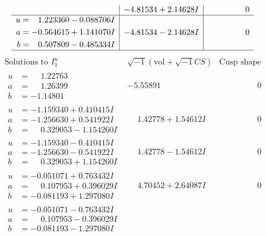 \documentclass[1p]{elsarticle_modified}
\theoremstyle{definition}
\newcommand{\I}{\sqrt{-1}}
\begin{document}
$$\begin{array}{c|c|c}
 & -4.81534 + 2.14628 I & \phantom{-0.000000 } 0 \\ \hline\begin{aligned}
u &= \phantom{-}1.223360 - 0.088706 I \\
a &= -0.564615 + 1.141070 I \\
b &= \phantom{-}0.507809 - 0.485334 I\end{aligned}
 & -4.81534 - 2.14628 I & \phantom{-0.000000 } 0\\
 \hline 
 \end{array}$$\newpage$$\begin{array}{c|c|c}  
\text{Solutions to }I^u_{1}& \I (\text{vol} + \sqrt{-1}CS) & \text{Cusp shape}\\
 \hline 
\begin{aligned}
u &= \phantom{-}1.22763\phantom{ +0.000000I} \\
a &= \phantom{-}1.26399\phantom{ +0.000000I} \\
b &= -1.14801\phantom{ +0.000000I}\end{aligned}
 & -5.55891\phantom{ +0.000000I} & \phantom{-0.000000 } 0 \\ \hline\begin{aligned}
u &= -1.159340 + 0.410415 I \\
a &= -1.256630 + 0.541922 I \\
b &= \phantom{-}0.329053 - 1.154260 I\end{aligned}
 & \phantom{-}1.42778 + 1.54612 I & \phantom{-0.000000 } 0 \\ \hline\begin{aligned}
u &= -1.159340 - 0.410415 I \\
a &= -1.256630 - 0.541922 I \\
b &= \phantom{-}0.329053 + 1.154260 I\end{aligned}
 & \phantom{-}1.42778 - 1.54612 I & \phantom{-0.000000 } 0 \\ \hline\begin{aligned}
u &= -0.051071 + 0.763432 I \\
a &= \phantom{-}0.107953 + 0.396029 I \\
b &= -0.081193 + 1.297080 I\end{aligned}
 & \phantom{-}4.70452 + 2.64087 I & \phantom{-0.000000 } 0 \\ \hline\begin{aligned}
u &= -0.051071 - 0.763432 I \\
a &= \phantom{-}0.107953 - 0.396029 I \\
b &= -0.081193 - 1.297080 I\end{aligned}

\end{array}$$
\end{document}
